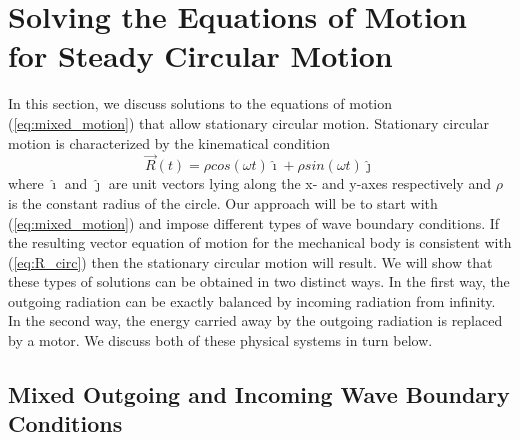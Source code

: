 \section{Solving the Equations of Motion for Steady Circular Motion}

In this section, we discuss solutions to the equations of motion 
(\ref{eq:mixed_motion}) that allow stationary circular motion.
Stationary circular motion is characterized by the kinematical 
condition
\begin{equation}\label{eq:R_circ}
{\vec R}(t) = \rho cos(\omega t) {\hat \imath} + \rho sin(\omega t) {\hat \jmath}
\end{equation}
where ${\hat \imath}$ and ${\hat \jmath}$ are unit vectors lying 
along the x- and y-axes respectively and $\rho$ is the constant
radius of the circle.
Our approach will be to start with (\ref{eq:mixed_motion}) and 
impose different types of wave boundary conditions.
If the resulting vector equation of motion for the mechanical body 
is consistent with (\ref{eq:R_circ}) then the stationary circular 
motion will result.  
We will show that these types of solutions can be obtained in 
two distinct ways.
In the first way, the outgoing radiation can be exactly balanced 
by incoming radiation from infinity.
In the second way, the energy carried away by the outgoing 
radiation is replaced by a motor.
We discuss both of these physical systems in turn below.   

\subsection{Mixed Outgoing and Incoming Wave Boundary Conditions}

